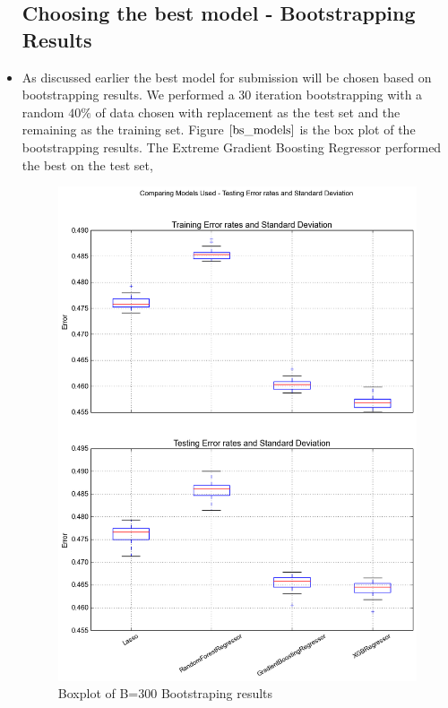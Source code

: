 \documentclass[twoside,12pt]{article}
\begin{document}
\begin{itemize}
\subsection{Choosing the best model - Bootstrapping Results}
\FloatBarrier
\item
As discussed earlier the best model for submission will be chosen based on bootstrapping results. We performed a 30 iteration bootstrapping with a random $40\%$ of data chosen with replacement as the test set and the remaining as the training set. Figure $\eqref{bs_models}$ is the box plot of the bootstrapping results. The Extreme Gradient Boosting Regressor performed the best on the test set,
\begin{figure}[!htbp]
\centering
\includegraphics[scale=.65]{DataVisualization/models.png} 
\caption{Boxplot of B=300 Bootstraping results}
\label{bs_models}
\end{figure}



\end{itemize}
\end{document}
